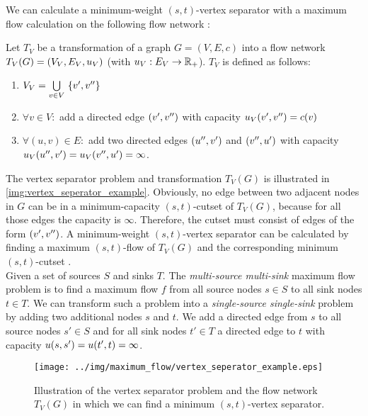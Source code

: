 We can calculate a minimum-weight $(s,t)$-vertex separator with a maximum flow
calculation on the following flow network \cite{west2001introduction}:

\begin{definition}
\label{def:vertex_seperator_transformation}
Let $T_V$ be a transformation of a graph $G = (V,E,c)$ into 
a flow network $T_V(G) = (V_V, E_V, u_V)$ (with $u_V: E_V \rightarrow \mathbb{R}_+$). 
$T_V$ is defined as follows:
\begin{enumerate}
\item $V_V = \bigcup\limits_{v \in V}\ \{\incoming{v}, \outgoing{v}\}$
\item $\forall v \in V:$ add a directed edge $(v',v'')$
      with capacity $u_V(v',v'') = c(v)$
\item $\forall (u,v) \in E:$ add two directed edges $(u'', v')$ and 
      $(v'', u')$ with capacity $u_V(u'', v') = u_V(v'', u') = \infty$.
\end{enumerate} 
\end{definition}

The vertex separator problem and transformation $T_V(G)$ is illustrated in \autoref{img:vertex_seperator_example}.
Obviously, no edge between two adjacent nodes in $G$ can be in a minimum-capacity $(s,t)$-cutset of $T_V(G)$,
because for all those edges the capacity is $\infty$. Therefore, the cutset must consist
of edges of the form $(v',v'')$. A minimum-weight $(s,t)$-vertex separator can be calculated 
by finding a maximum $(s,t)$-flow of $T_V(G)$ and the corresponding minimum $(s,t)$-cutset \cite{menger1927allgemeinen}.\\
Given a set of sources $S$ and sinks $T$. The \emph{multi-source multi-sink} maximum flow problem is
to find a maximum flow $f$ from all source nodes $s \in S$ to all sink nodes $t \in T$.
We can transform such a problem into a \emph{single-source single-sink} problem by adding
two additional nodes $s$ and $t$. We add a directed edge from $s$ to all source nodes $s' \in S$ 
and for all sink nodes $t' \in T$ a directed edge to $t$ with capacity 
$u(s,s') = u(t',t) = \infty$.

\begin{figure}
\centering
\texttt{[image: ../img/maximum\_flow/vertex\_seperator\_example.eps]}
\caption{ Illustration of the vertex separator problem and the flow network $T_V(G)$ in which
          we can find a minimum $(s,t)$-vertex separator. }
\label{img:vertex_seperator_example}
\end{figure}

